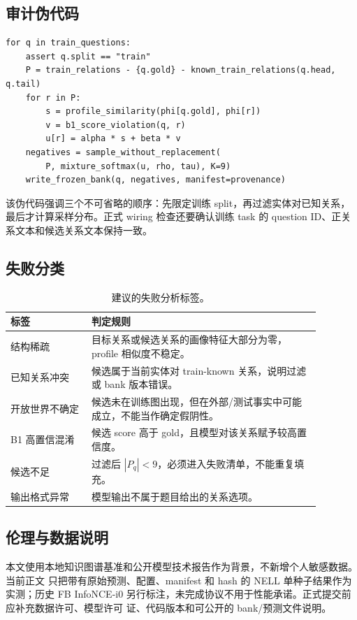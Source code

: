 \subsection{审计伪代码}

\small
\begin{verbatim}
for q in train_questions:
    assert q.split == "train"
    P = train_relations - {q.gold} - known_train_relations(q.head, q.tail)
    for r in P:
        s = profile_similarity(phi[q.gold], phi[r])
        v = b1_score_violation(q, r)
        u[r] = alpha * s + beta * v
    negatives = sample_without_replacement(
        P, mixture_softmax(u, rho, tau), K=9)
    write_frozen_bank(q, negatives, manifest=provenance)
\end{verbatim}

该伪代码强调三个不可省略的顺序：先限定训练 split，再过滤实体对已知关系，最后才计算采样分布。正式 wiring 检查还要确认训练 task 的 question ID、正关系文本和候选关系文本保持一致。

\subsection{失败分类}

\begin{table}[h]
\caption{建议的失败分析标签。}
\label{tab:failure}
\centering\scriptsize
\begin{tabular}{p{0.23\linewidth}p{0.65\linewidth}}
\toprule
标签 & 判定规则 \\
\midrule
结构稀疏 & 目标关系或候选关系的画像特征大部分为零，profile 相似度不稳定。 \\
已知关系冲突 & 候选属于当前实体对 train-known 关系，说明过滤或 bank 版本错误。 \\
开放世界不确定 & 候选未在训练图出现，但在外部/测试事实中可能成立，不能当作确定假阴性。 \\
B1 高置信混淆 & 候选 score 高于 gold，且模型对该关系赋予较高置信度。 \\
候选不足 & 过滤后 $|P_q|<9$，必须进入失败清单，不能重复填充。 \\
输出格式异常 & 模型输出不属于题目给出的关系选项。 \\
\bottomrule
\end{tabular}
\end{table}

\subsection{伦理与数据说明}

本文使用本地知识图谱基准和公开模型技术报告作为背景，不新增个人敏感数据。当前正文
只把带有原始预测、配置、manifest 和 hash 的 NELL 单种子结果作为实测；历史 FB
InfoNCE-i0 另行标注，未完成协议不用于性能承诺。正式提交前应补充数据许可、模型许可
证、代码版本和可公开的 bank/预测文件说明。


